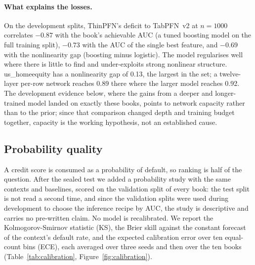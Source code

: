 \documentclass[twocolumn,10pt]{article}
\begin{document}
\paragraph{What explains the losses.} On the development splits, ThinPFN's deficit to TabPFN~v2 at $n=1000$ correlates
$-0.87$ with the book's achievable AUC (a tuned boosting model on the full training split), $-0.73$ with the AUC of the
single best feature, and $-0.69$ with the nonlinearity gap (boosting minus logistic). The model regularises well where
there is little to find and under-exploits strong nonlinear structure. us\_homeequity has a nonlinearity gap of 0.13,
the largest in the set; a twelve-layer per-row network reaches 0.89 there where the larger model reaches 0.92. The
development evidence below, where the gains from a deeper and longer-trained model landed on exactly these books,
points to network capacity rather than to the prior; since that comparison changed depth and training budget together,
capacity is the working hypothesis, not an established cause.

\subsection{Probability quality}
\label{sec:calibration}

A credit score is consumed as a probability of default, so ranking is half of the question. After the sealed test we
added a probability study with the same contexts and baselines, scored on the validation split of every book: the test
split is not read a second time, and since the validation splits were used during development to choose the inference
recipe by AUC, the study is descriptive and carries no pre-written claim. No model is recalibrated. We report the
Kolmogorov-Smirnov statistic (KS), the Brier skill against the constant forecast of the context's default rate, and the
expected calibration error over ten equal-count bins (ECE), each averaged over three seeds and then over the ten books
(Table~\ref{tab:calibration}, Figure~\ref{fig:calibration}).
\end{document}
